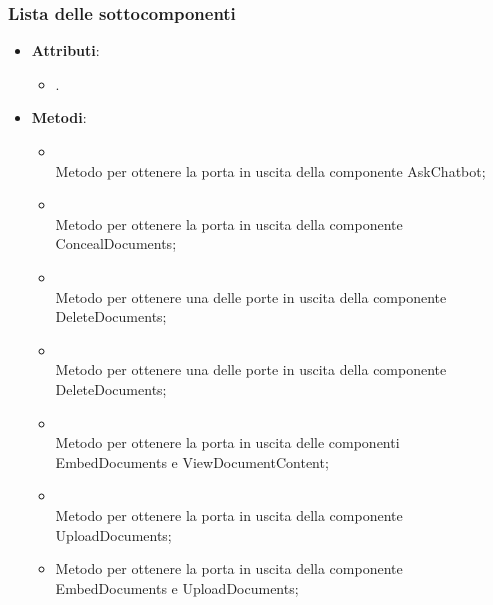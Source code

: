\documentclass[10pt, a4paper]{article}
\begin{document}
\subsubsection{Lista delle sottocomponenti}


\label{ConfigurationManagerDettaglio}
\begin{itemize}
    \item \textbf{Attributi}:
    \begin{itemize}
        \item {}. 
    \end{itemize}
    \item \textbf{Metodi}:
    \begin{itemize}
        \item {}\\ 
        Metodo per ottenere la porta in uscita della componente AskChatbot;

        \item {}\\ 
        Metodo per ottenere la porta in uscita della componente ConcealDocuments;

        \item {}\\ 
        Metodo per ottenere una delle porte in uscita della componente DeleteDocuments;

        \item {}\\ 
        Metodo per ottenere una delle porte in uscita della componente DeleteDocuments;

        \item {}\\ 
        Metodo per ottenere la porta in uscita delle componenti EmbedDocuments e ViewDocumentContent;

        \item {}\\ 
        Metodo per ottenere la porta in uscita della componente UploadDocuments;

        \item {}
        Metodo per ottenere la porta in uscita della componente EmbedDocuments e UploadDocuments;


\end{itemize}
\end{itemize}
\end{document}
